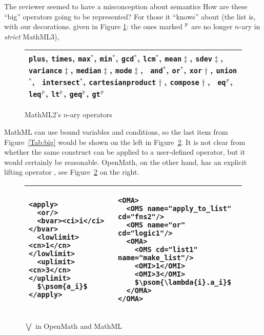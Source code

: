 \documentclass{llncs}
\begin{document}
\begin{newpart}{The reviewer seemed to have a misconception about semantics}
How are these ``big'' operators going to be represented?  For those it ``knows'' about
\cite[4.2.3.2]{WorldWideWebConsortium2003b} (the list is, with our decorations. given in
Figure \ref{fig:MMLnary}: the ones marked ${}^\P$ are no longer $n$-ary in {\emph{strict}}
MathML3),

\begin{figure}\vspace*{-1.5em}\centering
  \begin{tabular}{p{11cm}}\hline
{\tt plus}, {\tt times}, {\tt max}${}^*$, {\tt min}${}^*$, {\tt gcd}${}^*$,
{\tt lcm}${}^*$, {\tt mean}${}\ddag$, {\tt sdev}${}\ddag$, {\tt
variance}${}\ddag$, {\tt median}${}\ddag$, {\tt mode}${}\ddag$, {\tt
and}${}^*$, {\tt or}${}^*$, {\tt xor}${}\dag$, {\tt union}${}^*$, {\tt
intersect}${}^*$, {\tt cartesianproduct}${}\dag$, {\tt compose}${}\dag$, {\tt
eq}${}^\P$, {\tt leq}${}^\P$,
{\tt lt}${}^\P$, {\tt geq}${}^\P$, {\tt gt}${}^\P$\\\hline
\end{tabular}
\vspace*{-.5em}
\caption{MathML2's $n$-ary operators}\label{fig:MMLnary}\vspace*{-1.5em}
\end{figure}
MathML can use bound variables and conditions, so the last item from Figure~\ref{Tab:big}
would be shown on the left in Figure~\ref{fig:bigvee}. It is not clear from
\cite{WorldWideWebConsortium2003b} whether the same construct can be applied to a
user-defined operator, but it would certainly be reasonable. OpenMath, on the other hand,
has an explicit lifting operator {}, see Figure~\ref{fig:bigvee}
on the right.

\begin{figure}[ht]\centering%
\lstset{language=MathML2,mathescape,frame=none,numbers=none}
\lstset{mathescape,aboveskip=-.7em,belowskip=-1.2em}
\begin{tabular}{|p{5.7cm}|p{5.8cm}|}\hline
\begin{lstlisting}
<apply>
  <or/>
  <bvar><ci>i</ci></bvar>
  <lowlimit><cn>1</cn></lowlimit>
  <uplimit><cn>3</cn></uplimit>
  $\psom{a_i}$
</apply>
\end{lstlisting}
& \lstset{language=OpenMath}
\begin{lstlisting}
<OMA>
  <OMS name="apply_to_list" cd="fns2"/>
  <OMS name="or" cd="logic1"/>
  <OMA>
    <OMS cd="list1" name="make_list"/>
    <OMI>1</OMI>
    <OMI>3</OMI>
    $\psom{\lambda{i}.a_i}$
  </OMA>
</OMA>
\end{lstlisting}\\\hline
\end{tabular}\vspace*{-.5em}
\caption{$\bigvee$ in OpenMath and MathML}\label{fig:bigvee}\vspace*{-1.5em}
\end{figure}


\end{newpart}
\end{document}
